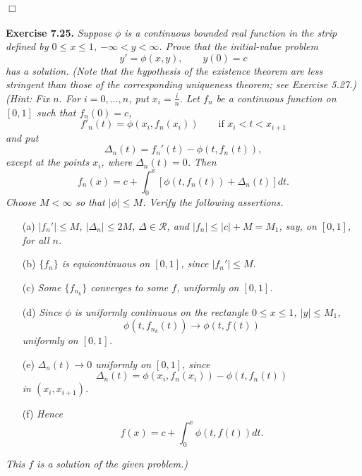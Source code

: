 \documentclass{article}
\begin{document}
$\Box$ \\\\






\textbf{Exercise 7.25.}
\emph{Suppose $\phi$ is a continuous bounded real function in the strip defined by
$0 \leq x \leq 1$, $-\infty < y < \infty$.
Prove that the initial-value problem
\[
  y' = \phi(x, y), \qquad y(0) = c
\]
has a solution.
(Note that the hypothesis of the existence theorem are less stringent than
those of the corresponding uniqueness theorem; see Exercise 5.27.)}
\emph{(Hint: Fix $n$.
For $i = 0,\ldots,n$, put $x_i = \frac{i}{n}$.
Let $f_n$ be a continuous function on $[0, 1]$ such that $f_n(0) = c$,
\[
  f'_n(t) = \phi(x_i, f_n(x_i))
  \qquad \text{if } x_i < t < x_{i+1}
\]
and put
\[
  \Delta_n(t) = f_n'(t) - \phi(t, f_n(t)),
\]
except at the points $x_i$, where $\Delta_n(t) = 0$.
Then
\[
  f_n(x) = c + \int_{0}^{x} [\phi(t, f_n(t)) + \Delta_n(t)] dt.
\]
Choose $M < \infty$ so that $|\phi| \leq M$.
Verify the following assertions.}
\begin{enumerate}
  \item[(a)]
  \emph{$|f_n'| \leq M$, $|\Delta_n| \leq 2M$, $\Delta \in \mathscr{R}$,
  and $|f_n| \leq |c| + M = M_1$, say, on $[0, 1]$, for all $n$.}

  \item[(b)]
  \emph{$\{f_n\}$ is equicontinuous on $[0, 1]$, since $|f_n'| \leq M$.}

  \item[(c)]
  \emph{Some $\{f_{n_k}\}$ converges to some $f$, uniformly on $[0, 1]$.}

  \item[(d)]
  \emph{Since $\phi$ is uniformly continuous on the rectangle $0 \leq x \leq 1$, $|y| \leq M_1$,
  \[
    \phi(t, f_{n_k}(t)) \to \phi(t, f(t))
  \]
  uniformly on $[0, 1]$.}

  \item[(e)]
  \emph{$\Delta_n(t) \to 0$ uniformly on $[0, 1]$,
  since
  \[
    \Delta_n(t) = \phi(x_i, f_n(x_i)) - \phi(t, f_n(t))
  \]
  in $(x_i, x_{i+1})$.}

  \item[(f)]
  \emph{Hence}
  \[
    f(x) = c + \int_{0}^{x} \phi(t, f(t)) dt.
  \]
\end{enumerate}
\emph{This $f$ is a solution of the given problem.)} \\
\end{document}
